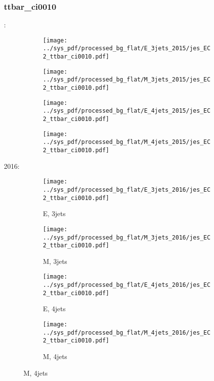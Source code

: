 \documentclass{beamer}
\begin{document}
\begin{frame}
\frametitle{ttbar_ci0010}
\fontsize{5}{1}:
\begin{figure}
\centering
\begin{subfigure}[b]{0.24\textwidth}
\texttt{[image: ../sys\_pdf/processed\_bg\_flat/E\_3jets\_2015/jes\_EC2\_ttbar\_ci0010.pdf]}
\end{subfigure}
\begin{subfigure}[b]{0.24\textwidth}
\texttt{[image: ../sys\_pdf/processed\_bg\_flat/M\_3jets\_2015/jes\_EC2\_ttbar\_ci0010.pdf]}
\end{subfigure}
\begin{subfigure}[b]{0.24\textwidth}
\texttt{[image: ../sys\_pdf/processed\_bg\_flat/E\_4jets\_2015/jes\_EC2\_ttbar\_ci0010.pdf]}
\end{subfigure}
\begin{subfigure}[b]{0.24\textwidth}
\texttt{[image: ../sys\_pdf/processed\_bg\_flat/M\_4jets\_2015/jes\_EC2\_ttbar\_ci0010.pdf]}
\end{subfigure}
\end{figure}
2016:
\begin{figure}
\centering
\begin{subfigure}[b]{0.24\textwidth}
\texttt{[image: ../sys\_pdf/processed\_bg\_flat/E\_3jets\_2016/jes\_EC2\_ttbar\_ci0010.pdf]}
\captionsetup{font=tiny}
\caption{E, 3jets}
\end{subfigure}
\begin{subfigure}[b]{0.24\textwidth}
\texttt{[image: ../sys\_pdf/processed\_bg\_flat/M\_3jets\_2016/jes\_EC2\_ttbar\_ci0010.pdf]}
\captionsetup{font=tiny}
\caption{M, 3jets}
\end{subfigure}
\begin{subfigure}[b]{0.24\textwidth}
\texttt{[image: ../sys\_pdf/processed\_bg\_flat/E\_4jets\_2016/jes\_EC2\_ttbar\_ci0010.pdf]}
\captionsetup{font=tiny}
\caption{E, 4jets}
\end{subfigure}
\begin{subfigure}[b]{0.24\textwidth}
\texttt{[image: ../sys\_pdf/processed\_bg\_flat/M\_4jets\_2016/jes\_EC2\_ttbar\_ci0010.pdf]}
\captionsetup{font=tiny}
\caption{M, 4jets}
\end{subfigure}
\end{figure}
\end{frame}
\end{document}
